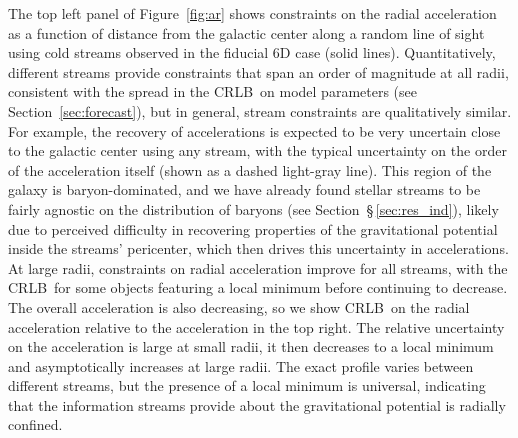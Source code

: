 \documentclass[modern]{aastex62}
\newcommand{\acronym}[1]{{\small{#1}}}
\newcommand{\CRLB}{\acronym{CRLB}}
\begin{document}
The top left panel of Figure~\ref{fig:ar} shows constraints on the radial acceleration as a function of distance from the galactic center along a random line of sight using cold streams observed in the fiducial 6D case (solid lines).
Quantitatively, different streams provide constraints that span an order of magnitude at all radii, consistent with the spread in the \CRLB\ on model parameters (see Section~\ref{sec:forecast}), but in general, stream constraints are qualitatively similar.
For example, the recovery of accelerations is expected to be very uncertain close to the galactic center using any stream, with the typical uncertainty on the order of the acceleration itself (shown as a dashed light-gray line).
This region of the galaxy is baryon-dominated, and we have already found stellar streams to be fairly agnostic on the distribution of baryons (see Section~\S\,\ref{sec:res_ind}), likely due to perceived difficulty in recovering properties of the gravitational potential inside the streams' pericenter, which then drives this uncertainty in accelerations.
At large radii, constraints on radial acceleration improve for all streams, with the \CRLB\ for some objects featuring a local minimum before continuing to decrease.
The overall acceleration is also decreasing, so we show \CRLB\ on the radial acceleration relative to the acceleration in the top right.
The relative uncertainty on the acceleration is large at small radii, it then decreases to a local minimum and asymptotically increases at large radii.
The exact profile varies between different streams, but the presence of a local minimum is universal, indicating that the information streams provide about the gravitational potential is radially confined.
\end{document}
